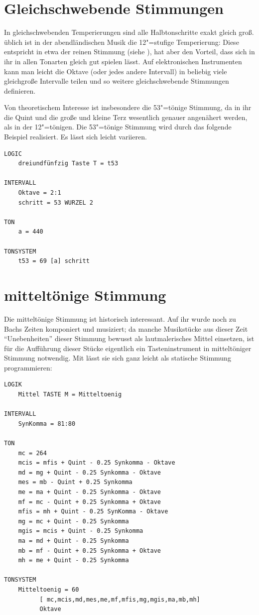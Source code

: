 \section{Gleichschwebende Stimmungen}
\label{sec:EX_EQUAL}

In gleichschwebenden Temperierungen sind alle Halbtonschritte 
exakt gleich groß. üblich ist in der abendländischen Musik 
die 12"=stufige Temperierung: Diese entspricht in etwa der reinen 
Stimmung (siehe ), hat aber den Vorteil, 
dass sich in ihr in allen Tonarten gleich gut spielen lässt. 
Auf elektronischen Instrumenten kann man leicht die Oktave (oder 
jedes andere Intervall) in beliebig viele gleichgroße Intervalle 
teilen und so weitere gleichschwebende Stimmungen definieren.


Von theoretischem Interesse ist insbesondere die 53"=tönige 
Stimmung, da in ihr die Quint und die große und kleine Terz 
wesentlich genauer angenähert werden, als in der 12"=tönigen. 
Die 53"=tönige Stimmung wird durch 
das folgende Beispiel realisiert. Es lässt sich leicht variieren.


\begin{verbatim}
LOGIC
    dreiundfünfzig Taste T = t53

INTERVALL 
    Oktave = 2:1
    schritt = 53 WURZEL 2

TON
    a = 440 

TONSYSTEM
    t53 = 69 [a] schritt
\end{verbatim}

\section{mitteltönige Stimmung}
\label{sec:EX_MITTELTOENIG}

Die mitteltönige Stimmung ist historisch interessant. Auf ihr 
wurde noch zu Bachs Zeiten komponiert und musiziert; da manche 
Musikstücke aus dieser Zeit "`Unebenheiten"' dieser Stimmung 
bewusst als lautmalerisches Mittel einsetzen, ist für die 
Aufführung dieser Stücke eigentlich ein Tasteninstrument 
in mitteltöniger Stimmung notwendig. Mit \mutabor{} lässt 
sie sich ganz leicht als statische Stimmung programmieren:



\begin{verbatim}
LOGIK 
    Mittel TASTE M = Mitteltoenig

INTERVALL 
    SynKomma = 81:80

TON
    mc = 264 
    mcis = mfis + Quint - 0.25 Synkomma - Oktave 
    md = mg + Quint - 0.25 Synkomma - Oktave 
    mes = mb - Quint + 0.25 Synkomma 
    me = ma + Quint - 0.25 Synkomma - Oktave 
    mf = mc - Quint + 0.25 Synkomma + Oktave 
    mfis = mh + Quint - 0.25 SynKomma - Oktave 
    mg = mc + Quint - 0.25 Synkomma 
    mgis = mcis + Quint - 0.25 Synkomma 
    ma = md + Quint - 0.25 Synkomma 
    mb = mf - Quint + 0.25 Synkomma + Oktave 
    mh = me + Quint - 0.25 Synkomma

TONSYSTEM
    Mitteltoenig = 60 
          [ mc,mcis,md,mes,me,mf,mfis,mg,mgis,ma,mb,mh] 
          Oktave
\end{verbatim}

